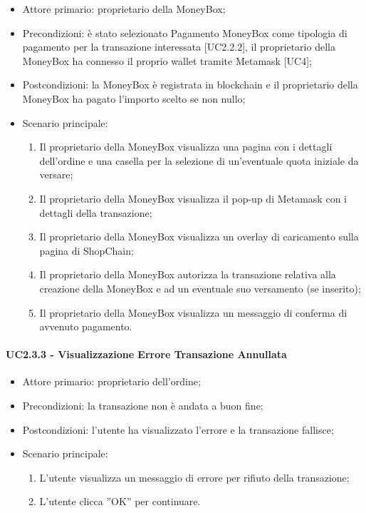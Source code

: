 \begin{itemize}
    \item Attore primario: proprietario della MoneyBox\glo{};
    \item Precondizioni: è stato selezionato Pagamento MoneyBox\glo{} come tipologia di pagamento per la transazione interessata [UC2.2.2], 
            il proprietario della MoneyBox\glo{} ha connesso il proprio wallet\glo{} tramite Metamask\glo{} [UC4];
    \item Postcondizioni: la MoneyBox\glo{} è registrata in blockchain e il proprietario della MoneyBox\glo{} ha pagato l'importo scelto se non nullo;
    \item Scenario principale:
    \begin{enumerate}
        \item Il proprietario della MoneyBox\glo{} visualizza una pagina con i dettagli dell'ordine e una casella per la selezione di un'eventuale quota iniziale da versare;
        \item Il proprietario della MoneyBox\glo{} visualizza il pop-up di Metamask\glo{} con i dettagli della transazione;
        \item Il proprietario della MoneyBox\glo{} visualizza un overlay di caricamento sulla pagina di ShopChain;
        \item Il proprietario della MoneyBox\glo{} autorizza la transazione relativa alla creazione della MoneyBox\glo{} e ad un eventuale suo versamento (se inserito);
        \item Il proprietario della MoneyBox\glo{} visualizza un messaggio di conferma di avvenuto pagamento.
    \end{enumerate}
\end{itemize}

\paragraph{UC2.3.3 - Visualizzazione Errore Transazione Annullata}

\begin{itemize}
    \item Attore primario: proprietario dell'ordine;
    \item Precondizioni: la transazione non è andata a buon fine;
    \item Postcondizioni: l'utente ha visualizzato l'errore e la transazione fallisce;
    \item Scenario principale:
        \begin{enumerate}
            \item L'utente visualizza un messaggio di errore per rifiuto della transazione;
            \item L'utente clicca ”OK” per continuare.
        \end{enumerate}
\end{itemize}

